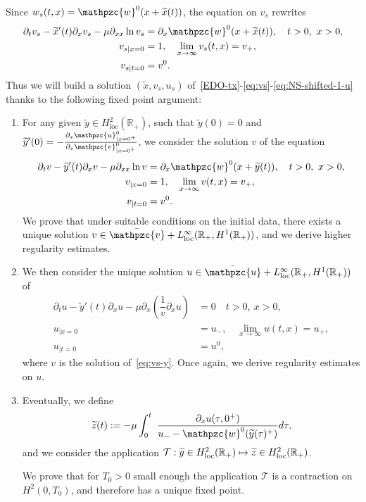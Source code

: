 \documentclass[AHL,Unicode,longabstracts,published]{cedram}
\newcommand{\R}{\mathbb{R}}
\newcommand{\p}{\partial}
\newcommand{\bv}{\bar{\mathpzc{v}}}
\newcommand{\bu}{\bar{\mathpzc{u}}}
\newcommand{\cT}{\mathcal T}
\newcommand{\rloc}{\mathrm{loc}}
\newcommand{\tv}{\mathpzc{v}}
\newcommand{\tu}{\mathpzc{u}}
\newcommand{\tw}{\mathpzc{w}}
\newcommand{\tx}{\widetilde{x}}
\newcommand{\ty}{\widetilde{y}}
\let\oldtilde\tilde
\renewcommand*{\tilde}[1]{\mathchoice{\widetilde{#1}}{\widetilde{#1}}{\oldtilde{#1}}{\oldtilde{#1}}}
\newcommand{\tx}{\widetilde{x}}
\begin{document}
Since $w_s(t,x)=\tw^0(x + \tx(t))$, the equation on $v_s$ rewrites
\begin{equation}\label{eq:vs}
\begin{aligned}
\p_t v_s - \tx'(t) \p_x v_s - \mu \p_{x x} \ln v_s &= \p_x \tw^0(x+ \tx(t)),\quad t>0, \ x>0,\\
v_{s|x=0} &=1,\quad \lim_{x\to \infty} v_s(t,x)= v_+,\\
v_{s|t=0} &=v^0.
\end{aligned}
\end{equation}
Thus we will build a solution $(\tx, v_s, u_s)$ of~\eqref{EDO-tx}-\eqref{eq:vs}-\eqref{eq:NS-shifted-1-u} thanks to the following fixed point argument:
\begin{enumerate}
\item For any given $\ty\in H^2_\rloc(\R_+)$, such that $\ty(0) = 0$ and $\ty'(0)= - \frac{\p_x \tu^0_{|x=0^+}}{\partial_x \tv^0_{|x=0^+}}$, we consider the solution $v$ of the equation
\begin{equation}\label{eq:vs-y}
\begin{aligned}
\p_t v - \ty'(t) \p_x v - \mu \p_{x x} \ln v &= \p_x \tw^0(x+ \ty(t)),\quad t>0, \ x>0,\\
v_{|x=0} &=1,\quad \lim_{x\to \infty} v(t,x)= v_+,\\
v_{|t=0} &=v^0.
\end{aligned}
\end{equation}
We prove that under suitable conditions on the initial data, there exists a unique solution $v \in \bv + L^\infty_\rloc(\R_+,H^1(\R_+))$, and we derive higher regularity estimates.
\item We then consider the unique solution $u\in \bu + L^\infty_\rloc(\R_+, H^1(\R_+))$ of
\begin{equation}\label{eq:us-y}
\begin{aligned}
\partial_t u - \ty'(t) \p_x u - \mu \partial_x\left(\dfrac{1}{v}\partial_x u\right) &= 0\quad t>0, \ x>0,\\
u_{|x=0} &= u_-, \quad \lim_{x\to \infty} u(t,x)= u_+,\\
u_{|t=0} &=u^0,
\end{aligned}
\end{equation}
where $v$ is the solution of~\eqref{eq:vs-y}. Once again, we derive regularity estimates on $u$.

\item Eventually, we define
\[
\tilde z(t):=-\mu \int_0^t \ \frac{ \p_x u(\tau, 0^+)}{u_- - \tw^0(\tilde y(\tau)^+)}d\tau,
\]
and we consider the application $\cT:\tilde y \in H^2_\rloc(\R_+) \mapsto \tilde z \in H^2_\rloc(\R_+)$.

\noindent We prove that for $T_0>0$ small enough the application $\cT$ is a contraction on $H^2(0, T_0)$, and therefore has a unique fixed point.
\end{enumerate}
\end{document}
